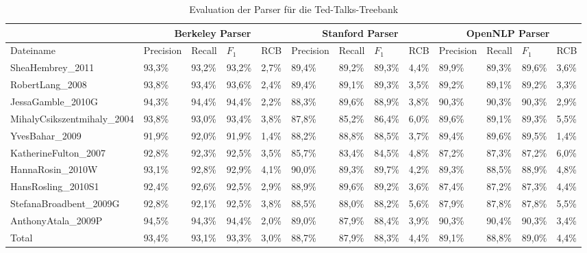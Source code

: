 \begin{sidewaystable}

\begin{tabular}{ | l || l | l | l | l || l | l | l | l || l | l | l | l |}
	\hline
	& \multicolumn{4}{|c||}{Berkeley Parser} & \multicolumn{4}{|c||}{Stanford Parser} & \multicolumn{4}{|c|}{OpenNLP Parser}\\ \hline
	Dateiname & Precision & Recall & \( F_1 \) & RCB & Precision & Recall & \( F_1 \) & RCB & Precision & Recall & \( F_1 \) & RCB  \\
	\hline \hline
	SheaHembrey\_2011 & 93,3\%  & 93,2\% & 93,2\% & 2,7\% & 89,4\% & 89,2\% & 89,3\% & 4,4\% & 89,9\% & 89,3\% & 89,6\% & 3,6\%\\ \hline
	RobertLang\_2008 & 93,8\% & 93,4\% & 93,6\% & 2,4\% & 89,4\% & 89,1\% & 89,3\% & 3,5\% & 89,2\% & 89,1\% & 89,2\% & 3,3\% \\ \hline
	JessaGamble\_2010G & 94,3\% & 94,4\% & 94,4\% & 2,2\% & 88,3\% & 89,6\% & 88,9\% & 3,8\% & 90,3\% & 90,3\% & 90,3\% & 2,9\% \\ \hline
	MihalyCsikszentmihaly\_2004 & 93,8\% & 93,0\% & 93,4\% & 3,8\% & 87,8\% & 85,2\% & 86,4\% & 6,0\% & 89,6\% & 89,1\% & 89,3\% & 5,5\% \\ \hline
	YvesBahar\_2009 & 91,9\% & 92,0\% & 91,9\% & 1,4\% & 88,2\% & 88,8\% & 88,5\% & 3,7\% & 89,4\% & 89,6\% & 89,5\% & 1,4\% \\ \hline
	KatherineFulton\_2007 & 92,8\% & 92,3\% & 92,5\% & 3,5\% & 85,7\% & 83,4\% & 84,5\% & 4,8\% & 87,2\% & 87,3\% & 87,2\% & 6,0\% \\ \hline
	HannaRosin\_2010W & 93,1\% & 92,8\% & 92,9\% & 4,1\% & 90,0\% & 89,3\% & 89,7\% & 4,2\% & 89,3\% & 88,5\% & 88,9\% & 4,8\% \\ \hline
	HansRosling\_2010S1 & 92,4\% & 92,6\% & 92,5\% & 2,9\% & 88,9\% & 89,6\% & 89,2\% & 3,6\% & 87,4\% & 87,2\% & 87,3\% & 4,4\% \\ \hline
	StefanaBroadbent\_2009G & 92,8\% & 92,1\% & 92,5\% & 3,8\% & 88,5\% & 88,0\% & 88,2\% & 5,6\% & 87,9\% & 87,8\% & 87,8\% & 5,5\% \\ \hline
	AnthonyAtala\_2009P & 94,5\% & 94,3\% & 94,4\% & 2,0\% & 89,0\% & 87,9\% & 88,4\% & 3,9\% & 90,3\% & 90,4\% & 90,3\% & 3,4\% \\ \hline \hline
	Total & 93,4\% & 93,1\% & 93,3\% & 3,0\% & 88,7\% & 87,9\% & 88,3\% & 4,4\% & 89,1\% & 88,8\% & 89,0\% & 4,4\% \\ \hline
\end{tabular}
\caption{Evaluation der Parser für die Ted-Talks-Treebank} 
\label{tab:eval-parser}
\end{sidewaystable} 
